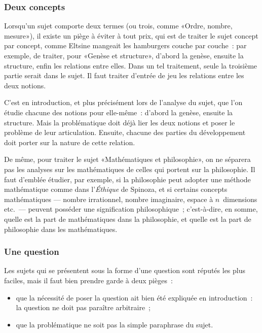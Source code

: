 \documentclass[a4paper,11pt]{article}
\newcommand{\cad}{c'est-à-dire}
\begin{document}
\subsubsection{Deux concepts}

Lorsqu'un sujet comporte deux termes (ou trois, comme «Ordre, nombre,
mesure»), il existe un piège à éviter à tout prix, qui est de traiter le
sujet concept par concept, comme Eltsine mangeait les hamburgers couche
par couche~: par exemple, de traiter, pour «Genèse et structure»,
d'abord la genèse, ensuite la structure, enfin les relations entre
elles. Dans un tel traitement, seule la troisième partie serait dans le
sujet. Il faut traiter d'entrée de jeu les relations entre les deux
notions.

\par

C'est en introduction, et plus précisément lors de l'analyse du sujet,
que l'on étudie chacune des notions pour elle-même~: d'abord la genèse,
ensuite la structure. Mais la problématique doit déjà lier les deux
notions et poser le problème de leur articulation. Ensuite, chacune des
parties du développement doit porter sur la nature de cette relation.

\par

De même, pour traiter le sujet «Mathématiques et philosophie», on ne
séparera pas les analyses sur les mathématiques de celles qui portent
sur la philosophie. Il faut d'emblée étudier, par exemple, si la
philosophie peut adopter une méthode mathématique comme dans
l'\emph{Éthique} de Spinoza, et si certains concepts mathématiques ---
nombre irrationnel, nombre imaginaire, espace à $n$~dimensions etc.~---
peuvent posséder une signification philosophique~; \cad{}, en somme,
quelle est la part de mathématiques dans la philosophie, et quelle est
la part de philosophie dans les mathématiques.



\subsubsection{Une question}

Les sujets qui se présentent sous la forme d'une question sont réputés
les plus faciles, mais il faut bien prendre garde à deux pièges~:
\begin{itemize}
\item que la nécessité de poser la question ait bien été expliquée en
  introduction~: la question ne doit pas paraître arbitraire~;
\item que la problématique ne soit pas la simple paraphrase du sujet.
\end{itemize}
\end{document}
